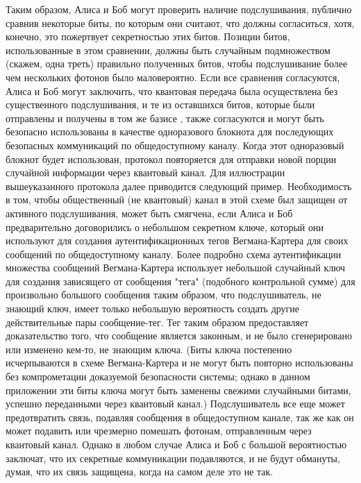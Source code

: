 Таким образом, Алиса и Боб могут проверить наличие подслушивания, публично сравнив некоторые биты, по которым они считают, что должны согласиться, хотя, конечно, это пожертвует секретностью этих битов. Позиции битов, использованные в этом сравнении, должны быть случайным подмножеством (скажем, одна треть) правильно полученных битов, чтобы подслушивание более чем нескольких фотонов было маловероятно. Если все сравнения согласуются, Алиса и Боб могут заключить, что квантовая передача была осуществлена без существенного подслушивания, и те из оставшихся битов, которые были отправлены и получены в том же базисе , также согласуются и могут быть безопасно использованы в качестве одноразового блокнота для последующих безопасных коммуникаций по общедоступному каналу. Когда этот одноразовый блокнот будет использован, протокол повторяется для отправки новой порции случайной информации через квантовый канал. Для иллюстрации вышеуказанного протокола далее приводится следующий пример. Необходимость в том, чтобы общественный (не квантовый) канал в этой схеме был защищен от активного подслушивания, может быть смягчена, если Алиса и Боб предварительно договорились о небольшом секретном ключе, который они используют для создания аутентификационных тегов Вегмана-Картера для своих сообщений по общедоступному каналу. Более подробно схема аутентификации множества сообщений Вегмана-Картера использует небольшой случайный ключ для создания зависящего от сообщения "тега" (подобного контрольной сумме) для произвольно большого сообщения таким образом, что подслушиватель, не знающий ключ, имеет только небольшую вероятность создать другие действительные пары сообщение-тег. Тег таким образом предоставляет доказательство того, что сообщение является законным, и не было сгенерировано или изменено кем-то, не знающим ключа. (Биты ключа постепенно исчерпываются в схеме Вегмана-Картера и не могут быть повторно использованы без компрометации доказуемой безопасности системы; однако в данном приложении эти биты ключа могут быть заменены свежими случайными битами, успешно переданными через квантовый канал.) Подслушиватель все еще может предотвратить связь, подавляя сообщения в общедоступном канале, так же как он может подавить или чрезмерно помешать фотонам, отправленным через квантовый канал. Однако в любом случае Алиса и Боб с большой вероятностью заключат, что их секретные коммуникации подавляются, и не будут обмануты, думая, что их связь защищена, когда на самом деле это не так.

